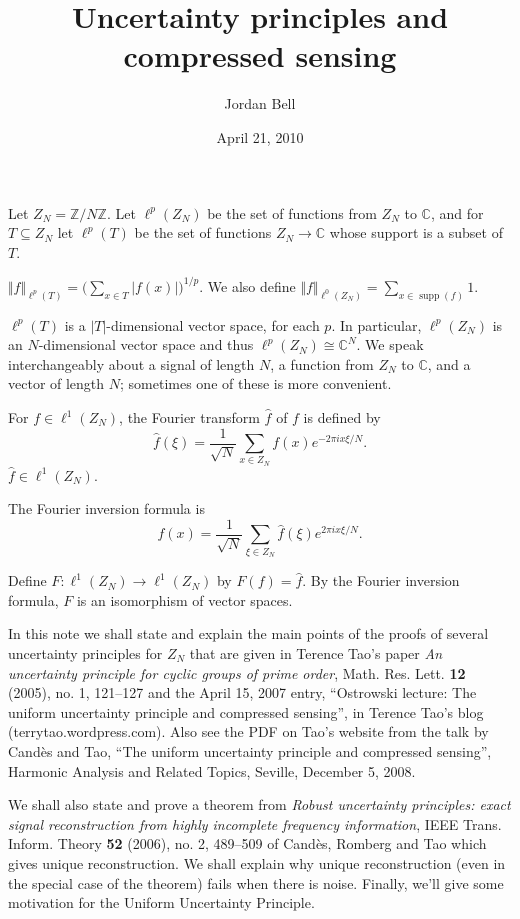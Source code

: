 \documentclass{article}
\newcommand{\norm}[1]{\Vert #1 \Vert}
\DeclareMathOperator{\supp}{supp}
\begin{document}
\title{Uncertainty principles and compressed sensing}
\author{Jordan Bell}
\date{April 21, 2010}
\maketitle

Let $Z_N=\mathbb{Z}/N\mathbb{Z}$. Let $\ell^p(Z_N)$ be the set of
functions from $Z_N$ to $\mathbb{C}$, and for $T \subseteq Z_N$ let
$\ell^p(T)$ be the set of functions $Z_N \to \mathbb{C}$
whose support is a subset of $T$.

$\norm{f}_{\ell^p(T)}=\big(\sum_{x \in T} |f(x)| \big)^{1/p}$.
We also define $\norm{f}_{\ell^0(Z_N)}=\sum_{x \in \supp(f)} 1$.

$\ell^p(T)$ is a $|T|$-dimensional vector space, for each $p$. In particular,
$\ell^p(Z_N)$ is an $N$-dimensional vector space and thus 
$\ell^p(Z_N) \cong \mathbb{C}^N$. We speak interchangeably about a signal
of length $N$, a function from $Z_N$ to $\mathbb{C}$, and a vector
of length $N$; sometimes one of these is more convenient.

For $f \in \ell^1(Z_N)$, the Fourier transform $\hat{f}$ of
$f$ is defined by
\[
\hat{f}(\xi)=\frac{1}{\sqrt{N}}\sum_{x \in Z_N} f(x)e^{-2\pi ix\xi/N}.
\]
$\hat{f} \in \ell^1(Z_N)$.

The Fourier inversion formula is
\[
f(x)=\frac{1}{\sqrt{N}}\sum_{\xi \in Z_N} \hat{f}(\xi)e^{2\pi ix\xi/N}.
\]

Define $F:\ell^1(Z_N) \to \ell^1(Z_N)$ by $F(f)=\hat{f}$. By the Fourier
inversion formula, $F$ is an isomorphism of vector spaces.


In this note we shall state and explain the main points of the proofs
of several uncertainty principles for $Z_N$ that are given
in Terence Tao's paper {\em An uncertainty principle for cyclic groups of prime order}, Math. Res. Lett. \textbf{12} (2005), no. 1, 121--127
and the April 15, 2007 entry, ``Ostrowski lecture: The uniform uncertainty
principle and compressed sensing'', in Terence Tao's blog (terrytao.wordpress.com).
Also see the PDF on Tao's website from the talk by Cand\`es and Tao,
``The uniform uncertainty principle and compressed sensing'',
Harmonic Analysis and Related Topics, Seville, December 5, 2008.

We shall also state and prove a theorem from {\em Robust uncertainty principles: exact signal reconstruction from highly incomplete frequency information},
IEEE Trans. Inform. Theory \textbf{52} (2006), no. 2, 489--509
of Cand\`es, Romberg and Tao which gives unique reconstruction.
We shall explain why unique reconstruction (even in the special case of
the theorem) fails when there is noise.
Finally, we'll give some motivation for the Uniform Uncertainty
Principle.
\end{document}
